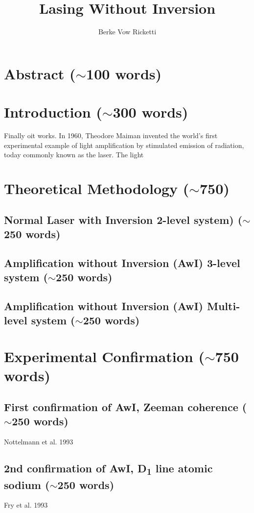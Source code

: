 \documentclass{article}
\title{Lasing Without Inversion}
\author{Berke Vow Ricketti}
\begin{document}
\maketitle{}




\section{Abstract ($\sim$100 words)}

\section{Introduction ($\sim$300 words)}
Finally oit works.
In 1960, Theodore Maiman invented the world's first experimental example of light amplification by stimulated emission of radiation, today commonly known as the laser. The light 

\cite{Harris1989,Scully1994,Kocharovskaya1986,Mandel1993,Kilin2008,Ukhanov1999,Zhu1992,Marthaler2011,Mompart2000}
\section{Theoretical Methodology ($\sim$750)}
\subsection{Normal Laser with Inversion 2-level system) ($\sim$250 words)}
\subsection{Amplification without Inversion (AwI) 3-level system ($\sim$250 words)}
\subsection{Amplification without Inversion (AwI) Multi-level system ($\sim$250 words)}

\section{Experimental Confirmation ($\sim$750 words)}
\subsection{First confirmation of AwI, Zeeman coherence ($\sim$250 words)}
Nottelmann et al. 1993 \cite{Nottelmann1993}
\subsection{2nd confirmation of AwI, D\textsubscript{1} line atomic sodium ($\sim$250 words)}
Fry et al. 1993 \cite{PhysRevLett.70.3235}
\end{document}
